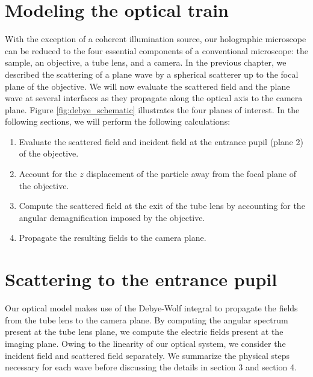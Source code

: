 \section{Modeling the optical train}

With the exception of a coherent illumination source, our holographic microscope
can be reduced to the four essential components of a conventional microscope:
the sample, an objective, a tube lens, and a camera. In the previous chapter,
we described the scattering of a plane wave by a spherical scatterer up to
the focal plane of the objective. We will now evaluate the scattered field and
the plane wave at several interfaces as they propagate along the optical axis
to the camera plane. Figure \ref{fig:debye_schematic} illustrates the four planes
of interest. In the following sections, we will perform the following calculations:
\begin{enumerate}
\item Evaluate the scattered field and incident field at the entrance pupil (plane 2)
  of the objective.
\item Account for the  $z$ displacement of the particle away from the focal
  plane of the objective.
\item Compute the scattered field at the exit of the tube lens by accounting
  for the angular demagnification imposed by the objective.
\item Propagate the resulting fields to the camera plane.
\end{enumerate}

\section{Scattering to the entrance pupil}


Our optical model makes use of the Debye-Wolf integral to propagate the
fields from the tube lens to the camera plane. By computing the
angular spectrum present at the tube lens plane, we compute the electric fields
present at the imaging plane. Owing to the linearity of our optical system,
we consider the incident field and scattered field separately. We summarize the physical
steps necessary for each wave before discussing the details in section 3 and section 4.

